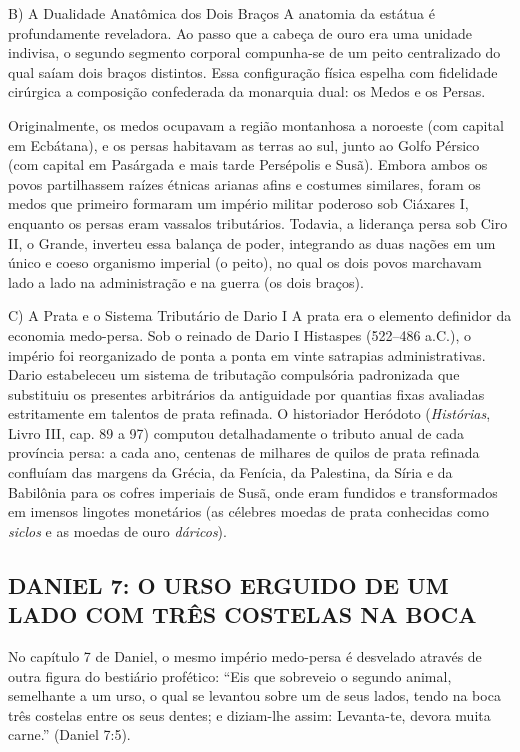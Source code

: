 B) A Dualidade Anatômica dos Dois Braços
A anatomia da estátua é profundamente reveladora. Ao passo que a cabeça de ouro era uma unidade indivisa, o segundo segmento corporal compunha-se de um peito centralizado do qual saíam dois braços distintos. Essa configuração física espelha com fidelidade cirúrgica a composição confederada da monarquia dual: os Medos e os Persas.

Originalmente, os medos ocupavam a região montanhosa a noroeste (com capital em Ecbátana), e os persas habitavam as terras ao sul, junto ao Golfo Pérsico (com capital em Pasárgada e mais tarde Persépolis e Susã). Embora ambos os povos partilhassem raízes étnicas arianas afins e costumes similares, foram os medos que primeiro formaram um império militar poderoso sob Ciáxares I, enquanto os persas eram vassalos tributários. Todavia, a liderança persa sob Ciro II, o Grande, inverteu essa balança de poder, integrando as duas nações em um único e coeso organismo imperial (o peito), no qual os dois povos marchavam lado a lado na administração e na guerra (os dois braços).

C) A Prata e o Sistema Tributário de Dario I
A prata era o elemento definidor da economia medo-persa. Sob o reinado de Dario I Histaspes (522–486 a.C.), o império foi reorganizado de ponta a ponta em vinte satrapias administrativas. Dario estabeleceu um sistema de tributação compulsória padronizada que substituiu os presentes arbitrários da antiguidade por quantias fixas avaliadas estritamente em talentos de prata refinada. O historiador Heródoto (\textit{Histórias}, Livro III, cap. 89 a 97) computou detalhadamente o tributo anual de cada província persa: a cada ano, centenas de milhares de quilos de prata refinada confluíam das margens da Grécia, da Fenícia, da Palestina, da Síria e da Babilônia para os cofres imperiais de Susã, onde eram fundidos e transformados em imensos lingotes monetários (as célebres moedas de prata conhecidas como \textit{siclos} e as moedas de ouro \textit{dáricos}).



\subsection{DANIEL 7: O URSO ERGUIDO DE UM LADO COM TRÊS COSTELAS NA BOCA}


No capítulo 7 de Daniel, o mesmo império medo-persa é desvelado através de outra figura do bestiário profético:
``Eis que sobreveio o segundo animal, semelhante a um urso, o qual se levantou sobre um de seus lados, tendo na boca três costelas entre os seus dentes; e diziam-lhe assim: Levanta-te, devora muita carne.'' (Daniel 7:5).

